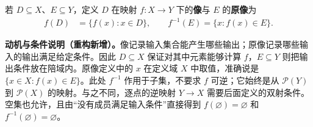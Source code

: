 \documentclass[../../main.tex]{subfiles}%
\begin{document}

\begin{definition}[像与原像]\label{definition:ch00-image-inverse-image}
若 $D\subseteq X$、$E\subseteq Y$，定义 $D$ 在映射 $f:X\to Y$ 下的\textbf{像}与 $E$ 的\textbf{原像}为
\begin{align*}
f(D)&=\{f(x):x\in D\},\qquad f^{-1}(E)=\{x:f(x)\in E\}.
\end{align*}
\end{definition}
\begin{remark}
\textbf{动机与条件说明（重构新增）。}像记录输入集合能产生哪些输出；原像记录哪些输入的输出满足给定条件。因此 $D\subseteq X$ 保证对其中元素能够计算 $f$，$E\subseteq Y$ 则把输出条件放在陪域内。原像定义中的 $x$ 在定义域 $X$ 中取值，准确说是 $\{x\in X:f(x)\in E\}$。此处 $f^{-1}$ 作用于子集，不要求 $f$ 可逆；它始终是从 $\mathscr{P}(Y)$ 到 $\mathscr{P}(X)$ 的映射。与之不同，逐点的逆映射 $Y\to X$ 需要后面定义的双射条件。空集也允许，且由“没有成员满足输入条件”直接得到 $f(\varnothing)=\varnothing$ 和 $f^{-1}(\varnothing)=\varnothing$。
\end{remark}


\end{document}
